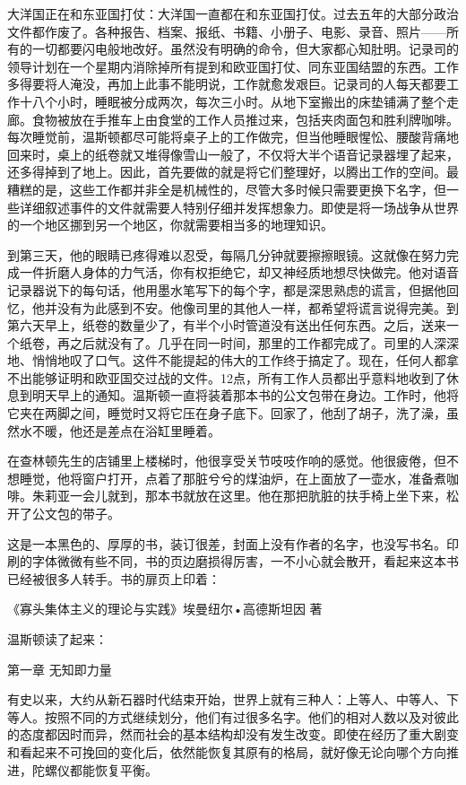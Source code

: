 大洋国正在和东亚国打仗：大洋国一直都在和东亚国打仗。过去五年的大部分政治文件都作废了。各种报告、档案、报纸、书籍、小册子、电影、录音、照片------所有的一切都要闪电般地改好。虽然没有明确的命令，但大家都心知肚明。记录司的领导计划在一个星期内消除掉所有提到和欧亚国打仗、同东亚国结盟的东西。工作多得要将人淹没，再加上此事不能明说，工作就愈发艰巨。记录司的人每天都要工作十八个小时，睡眠被分成两次，每次三小时。从地下室搬出的床垫铺满了整个走廊。食物被放在手推车上由食堂的工作人员推过来，包括夹肉面包和胜利牌咖啡。每次睡觉前，温斯顿都尽可能将桌子上的工作做完，但当他睡眼惺忪、腰酸背痛地回来时，桌上的纸卷就又堆得像雪山一般了，不仅将大半个语音记录器埋了起来，还多得掉到了地上。因此，首先要做的就是将它们整理好，以腾出工作的空间。最糟糕的是，这些工作都并非全是机械性的，尽管大多时候只需要更换下名字，但一些详细叙述事件的文件就需要人特别仔细并发挥想象力。即使是将一场战争从世界的一个地区挪到另一个地区，你就需要相当多的地理知识。

到第三天，他的眼睛已疼得难以忍受，每隔几分钟就要擦擦眼镜。这就像在努力完成一件折磨人身体的力气活，你有权拒绝它，却又神经质地想尽快做完。他对语音记录器说下的每句话，他用墨水笔写下的每个字，都是深思熟虑的谎言，但据他回忆，他并没有为此感到不安。他像司里的其他人一样，都希望将谎言说得完美。到第六天早上，纸卷的数量少了，有半个小时管道没有送出任何东西。之后，送来一个纸卷，再之后就没有了。几乎在同一时间，那里的工作都完成了。司里的人深深地、悄悄地叹了口气。这件不能提起的伟大的工作终于搞定了。现在，任何人都拿不出能够证明和欧亚国交过战的文件。12点，所有工作人员都出乎意料地收到了休息到明天早上的通知。温斯顿一直将装着那本书的公文包带在身边。工作时，他将它夹在两脚之间，睡觉时又将它压在身子底下。回家了，他刮了胡子，洗了澡，虽然水不暖，他还是差点在浴缸里睡着。

在查林顿先生的店铺里上楼梯时，他很享受关节吱吱作响的感觉。他很疲倦，但不想睡觉，他将窗户打开，点着了那脏兮兮的煤油炉，在上面放了一壶水，准备煮咖啡。朱莉亚一会儿就到，那本书就放在这里。他在那把肮脏的扶手椅上坐下来，松开了公文包的带子。

这是一本黑色的、厚厚的书，装订很差，封面上没有作者的名字，也没写书名。印刷的字体微微有些不同，书的页边磨损得厉害，一不小心就会散开，看起来这本书已经被很多人转手。书的扉页上印着：

《寡头集体主义的理论与实践》埃曼纽尔•高德斯坦因 著

温斯顿读了起来：

第一章 无知即力量

有史以来，大约从新石器时代结束开始，世界上就有三种人：上等人、中等人、下等人。按照不同的方式继续划分，他们有过很多名字。他们的相对人数以及对彼此的态度都因时而异，然而社会的基本结构却没有发生改变。即使在经历了重大剧变和看起来不可挽回的变化后，依然能恢复其原有的格局，就好像无论向哪个方向推进，陀螺仪都能恢复平衡。

